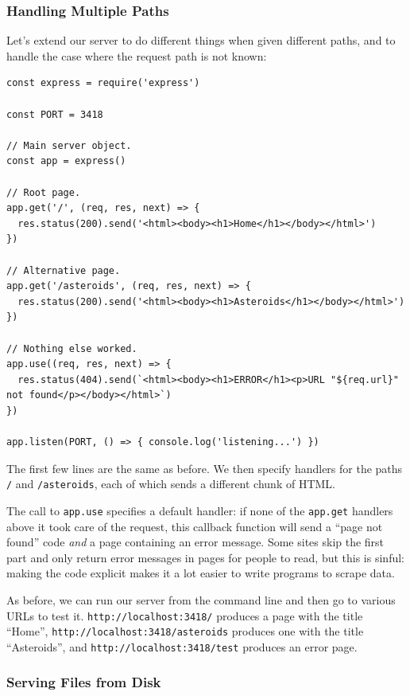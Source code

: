 \subsubsection{Handling Multiple Paths}\label{s:server-paths}

Let's extend our server to do different things when given different
paths, and to handle the case where the request path is not known:

\begin{verbatim}
const express = require('express')

const PORT = 3418

// Main server object.
const app = express()

// Root page.
app.get('/', (req, res, next) => {
  res.status(200).send('<html><body><h1>Home</h1></body></html>')
})

// Alternative page.
app.get('/asteroids', (req, res, next) => {
  res.status(200).send('<html><body><h1>Asteroids</h1></body></html>')
})

// Nothing else worked.
app.use((req, res, next) => {
  res.status(404).send(`<html><body><h1>ERROR</h1><p>URL "${req.url}" not found</p></body></html>`)
})

app.listen(PORT, () => { console.log('listening...') })
\end{verbatim}

The first few lines are the same as before. We then specify handlers for
the paths \texttt{/} and \texttt{/asteroids}, each of which sends a
different chunk of HTML.

The call to \texttt{app.use} specifies a default handler: if none of the
\texttt{app.get} handlers above it took care of the request, this
callback function will send a ``page not found'' code \emph{and} a page
containing an error message. Some sites skip the first part and only
return error messages in pages for people to read, but this is sinful:
making the code explicit makes it a lot easier to write programs to
scrape data.

As before, we can run our server from the command line and then go to
various URLs to test it. \texttt{http://localhost:3418/} produces a page
with the title ``Home'', \texttt{http://localhost:3418/asteroids}
produces one with the title ``Asteroids'', and
\texttt{http://localhost:3418/test} produces an error page.

\subsubsection{Serving Files from Disk}\label{s:server-files}


